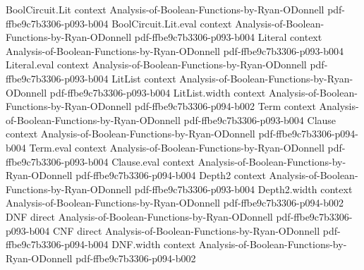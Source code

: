 \begin{theorem}
\leanok
{}
\proofstep
  {BoolCircuit.Lit}
  {context}
  {Analysis-of-Boolean-Functions-by-Ryan-ODonnell}
  {pdf-ffbe9c7b3306-p093-b004}
\proofstep
  {BoolCircuit.Lit.eval}
  {context}
  {Analysis-of-Boolean-Functions-by-Ryan-ODonnell}
  {pdf-ffbe9c7b3306-p093-b004}
\proofstep
  {Literal}
  {context}
  {Analysis-of-Boolean-Functions-by-Ryan-ODonnell}
  {pdf-ffbe9c7b3306-p093-b004}
\proofstep
  {Literal.eval}
  {context}
  {Analysis-of-Boolean-Functions-by-Ryan-ODonnell}
  {pdf-ffbe9c7b3306-p093-b004}
\proofstep
  {LitList}
  {context}
  {Analysis-of-Boolean-Functions-by-Ryan-ODonnell}
  {pdf-ffbe9c7b3306-p093-b004}
\proofstep
  {LitList.width}
  {context}
  {Analysis-of-Boolean-Functions-by-Ryan-ODonnell}
  {pdf-ffbe9c7b3306-p094-b002}
\proofstep
  {Term}
  {context}
  {Analysis-of-Boolean-Functions-by-Ryan-ODonnell}
  {pdf-ffbe9c7b3306-p093-b004}
\proofstep
  {Clause}
  {context}
  {Analysis-of-Boolean-Functions-by-Ryan-ODonnell}
  {pdf-ffbe9c7b3306-p094-b004}
\proofstep
  {Term.eval}
  {context}
  {Analysis-of-Boolean-Functions-by-Ryan-ODonnell}
  {pdf-ffbe9c7b3306-p093-b004}
\proofstep
  {Clause.eval}
  {context}
  {Analysis-of-Boolean-Functions-by-Ryan-ODonnell}
  {pdf-ffbe9c7b3306-p094-b004}
\proofstep
  {Depth2}
  {context}
  {Analysis-of-Boolean-Functions-by-Ryan-ODonnell}
  {pdf-ffbe9c7b3306-p093-b004}
\proofstep
  {Depth2.width}
  {context}
  {Analysis-of-Boolean-Functions-by-Ryan-ODonnell}
  {pdf-ffbe9c7b3306-p094-b002}
\proofstep
  {DNF}
  {direct}
  {Analysis-of-Boolean-Functions-by-Ryan-ODonnell}
  {pdf-ffbe9c7b3306-p093-b004}
\proofstep
  {CNF}
  {direct}
  {Analysis-of-Boolean-Functions-by-Ryan-ODonnell}
  {pdf-ffbe9c7b3306-p094-b004}
\proofstep
  {DNF.width}
  {context}
  {Analysis-of-Boolean-Functions-by-Ryan-ODonnell}
  {pdf-ffbe9c7b3306-p094-b002}

\end{theorem}
